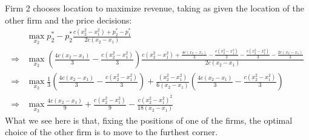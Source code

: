\documentclass[11pt]{article} %
\begin{document}
Firm 2 chooses location to maximize revenue, taking as given the location of the other firm and the price decisions:
\begin{align*}
&\max_{x_2}  p_2^{*}-p_2^{*}\frac{c(x_2^2 - x_1^2) + p_2^{*} - p_1^{*}}{2c(x_2 - x_1)}\\
\Rightarrow&\max_{x_2}  \left(\frac{4c(x_2 - x_1)}{3} - \frac{c(x_2^2 - x_1^2)}{3}\right)\frac{c(x_2^2 - x_1^2) +  \frac{4c(x_2 - x_1)}{3} - \frac{c(x_2^2 - x_1^2)}{3} - \frac{c(x_2^2 - x_1^2)}{3} - \frac{2c(x_2 - x_1)}{3}}{2c(x_2 - x_1)}\\
\Rightarrow&\max_{x_2}  \frac{1}{3}\left(\frac{4c(x_2 - x_1)}{3} - \frac{c(x_2^2 - x_1^2)}{3}\right) + \frac{(x_2^2 - x_1^2)}{6(x_2 - x_1)}\left(\frac{4c(x_2 - x_1)}{3} - \frac{c(x_2^2 - x_1^2)}{3}\right)\\
\Rightarrow&\max_{x_2} \frac{4c(x_2 - x_1)}{9} + \frac{c(x_2^2 - x_1^2)}{9} - \frac{c(x_2^2 - x_1^2)^2}{18(x_2 - x_1)}%
\end{align*}
What we see here is that, fixing the positions of one of the firms, the optimal choice of the other firm is to move to the furthest corner.
\end{document}
